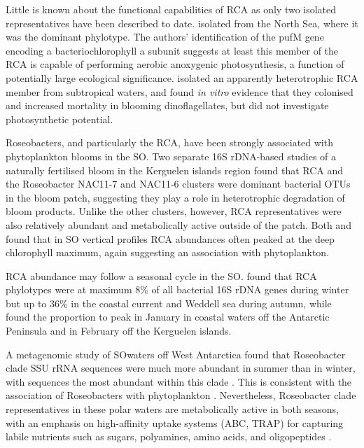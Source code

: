 Little is known about the functional capabilities of \ac{RCA} as only two isolated representatives have been described to date.
\citep{Giebel:2010bsa} isolated  from the North Sea, where it was the dominant phylotype.
The authors' identification of the pufM gene encoding a bacteriochlorophyll a subunit suggests at least this member of the \ac{RCA} is capable of performing aerobic anoxygenic photosynthesis, a function of potentially large ecological significance.
\citep{Mayali:2008eb} isolated an apparently heterotrophic \ac{RCA} member from subtropical waters, and found \emph{in vitro} evidence that they colonised and increased mortality in blooming dinoflagellates, but did not investigate photosynthetic potential.

Roseobacters, and particularly the \ac{RCA}, have been strongly associated with phytoplankton blooms in the \ac{SO}.
Two separate 16S rDNA-based studies of a naturally fertilised bloom in the Kerguelen islands region \cite{West:2008kc,Obernosterer:2011df} found that \ac{RCA} and the Roseobacter NAC11-7 and NAC11-6 clusters were dominant bacterial \acp{OTU} in the bloom patch, suggesting they play a role in heterotrophic degradation of bloom products.
Unlike the other clusters, however, \ac{RCA} representatives were also relatively abundant and metabolically active outside of the patch.
Both \citep{Giebel:2009hr} and \citep{Obernosterer:2011df} found that in \ac{SO} vertical profiles \ac{RCA} abundances often peaked at the deep chlorophyll maximum, again suggesting an association with phytoplankton.

\ac{RCA} abundance may follow a seasonal cycle in the \ac{SO}.
\citep{Giebel:2009hr} found that \ac{RCA} phylotypes were at maximum 8\% of all bacterial 16S rDNA genes during winter but up to 36\% in the coastal current and Weddell sea during autumn, while \citep{Ghiglione:2011ee} found the proportion to peak in January in coastal waters off the Antarctic Peninsula and in February off the Kerguelen islands. 

A metagenomic study of \ac{SO}waters off West Antarctica found that Roseobacter clade \ac{SSU} rRNA sequences were much more abundant in summer than in winter, with  sequences the most abundant within this clade \cite{Grzymski:2012ej}.
This is consistent with the association of Roseobacters with phytoplankton \cite{Moran:2003cwa}.
Nevertheless, Roseobacter clade representatives in these polar waters are metabolically active in both seasons, with an emphasis on high-affinity uptake systems (ABC, TRAP) for capturing labile nutrients such as sugars, polyamines, amino acids, and oligopeptides \cite{Williams:2012bs}.

